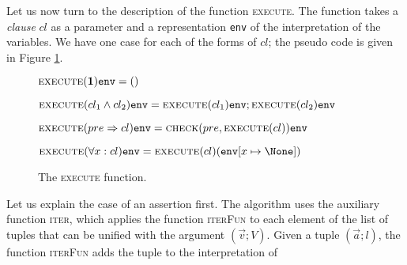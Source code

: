 Let us now turn to the description of the function
\textsc{execute}. The function takes a \emph{clause} $cl$ as a
parameter and a representation {\tt env} of the interpretation of the
variables. We have one case for each of the forms of $cl$; the pseudo
code is given in Figure \ref{figure:function-execute}.
\begin{figure}
\centering
\begin{minipage}{.77\textwidth}
\begin{algorithmic}
\State$\textsc{execute}({\bf 1}){\tt env} = ()$
\end{algorithmic}
\begin{algorithmic}
  \State$\textsc{execute}(cl_1\wedge cl_2){\tt env} =
  \textsc{execute}(cl_1){\tt env}; \textsc{execute}(cl_2){\tt env}$
\end{algorithmic}
\begin{algorithmic}
  \State$\textsc{execute}(pre\Rightarrow cl){\tt env} =
  \textsc{check}(pre,\textsc{execute}(cl)){\tt env}$
\end{algorithmic}
\begin{algorithmic}
  \State$\textsc{execute}(\forall x: cl){\tt env} =
  {\textsc{execute}}(cl)({\tt env}[x \mapsto \None])$
\end{algorithmic}
\end{minipage}
\caption[]{The \textsc{execute} function.}
\label{figure:function-execute}
\end{figure}
Let us explain the case of an assertion first. The algorithm uses the
auxiliary function \textsc{iter}, which applies the function
\textsc{iterFun} to each element of the list of tuples that can be
unified with the argument $(;V)$. Given a tuple $(;l)$,
the function \textsc{iterFun} adds the tuple to the interpretation of

